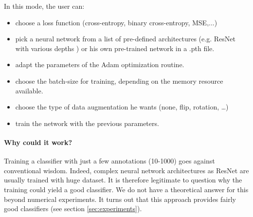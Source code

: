 \documentclass{article}
\begin{document}
In this mode, the user can:
\begin{itemize}
  \setlength{\itemsep}{3pt}%
  \setlength{\parskip}{0pt}%
 \item choose a loss function (cross-entropy, binary cross-entropy, MSE,...)
 \item pick a neural network from a list of pre-defined architectures (e.g. ResNet with various depths \cite{7780459}) or his own pre-trained network in a .pth file.
 \item adapt the parameters of the Adam optimization routine.
 \item choose the batch-size for training, depending on the memory resource available.
 \item choose the type of data augmentation he wants (none, flip, rotation, \ldots)
 \item train the network with the previous parameters.
\end{itemize}

\paragraph*{Why could it work?}

Training a classifier with just a few annotations (10-1000) goes against conventional wisdom. Indeed, complex neural network architectures as ResNet are usually trained with huge dataset. It is therefore legitimate to question why the training could yield a good classifier. 
We do not have a theoretical answer for this beyond numerical experiments. 
It turns out that this approach provides fairly good classifiers (see section \ref{sec:experiments}).
\end{document}
